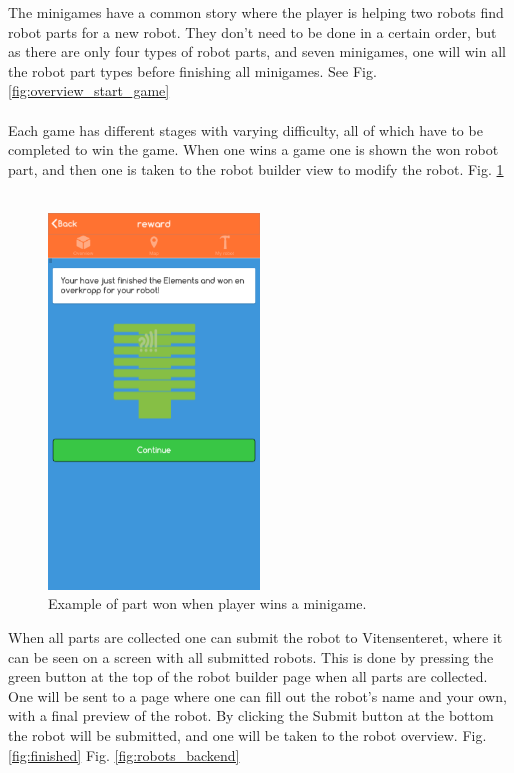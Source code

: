 The minigames have a common story where the player is helping two robots find robot parts for a new robot. They don't need to be done in a certain order, but as there are only four types of robot parts, and seven minigames, one will win all the robot part types before finishing all minigames. See Fig. \ref{fig:overview_start_game}
\\\\
Each game has different stages with varying difficulty, all of which have to be completed to win the game.
When one wins a game one is shown the won robot part, and then one is taken to the robot builder view to modify the robot. Fig. \ref{fig:reward}
\\\\
\begin{figure}[H]
    \centering
    \includegraphics[width=0.5\textwidth]{images/app/reward.png}
    \caption{Example of part won when player wins a minigame.}
    \label{fig:reward}
\end{figure}
When all parts are collected one can submit the robot to Vitensenteret, where it can be seen on a screen with all submitted robots. This is done by pressing the green button at the top of the robot builder page when all parts are collected. One will be sent to a page where one can fill out the robot's name and your own, with a final preview of the robot. By clicking the Submit button at the bottom the robot will be submitted, and one will be taken to the robot overview. Fig. \ref{fig:finished} Fig. \ref{fig:robots_backend}
